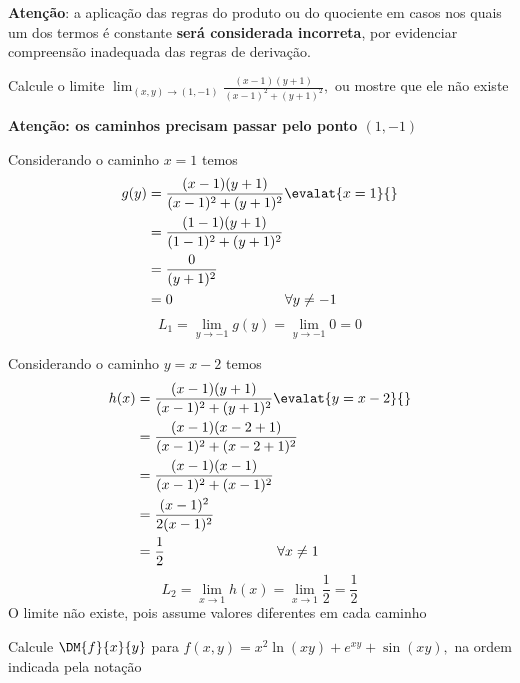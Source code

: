 \documentclass[a4paper,12pt,fleqn]{article}
\begin{document}

\bigskip
\textbf{Atenção}: a aplicação das regras do produto ou do quociente em casos
nos quais um dos termos é constante \textbf{será considerada incorreta},
por evidenciar compreensão inadequada das regras de derivação.

Calcule o limite
\(
    \lim_{(x,y) \to (1, -1)} \frac{(x-1)(y+1)}{(x-1)^2 + (y+1)^2},
\)
ou mostre que ele não existe

\begin{answer}
  \textbf{Atenção: os caminhos precisam passar pelo ponto $(1, -1)$}
  \bigskip

  Considerando o caminho $x=1$ temos
  \begin{align*}
    g(y)
    & = \frac{(x-1)(y+1)}{(x-1)^2 + (y+1)^2} \evalat{x=1}{} \\
    & = \frac{(1-1)(y+1)}{(1-1)^2 + (y+1)^2} \\
    & = \frac{0}{(y+1)^2} \\
    & = 0 \qquad\qquad\qquad\qquad \forall y \neq -1
  \end{align*}
  \[
    L_1
    = \lim_{y\to -1} g(y)
    = \lim_{y\to -1} 0
    = 0
  \]

  Considerando o caminho $y=x-2$ temos
  \begin{align*}
    h(x)
    & = \frac{(x-1)(y+1)}{(x-1)^2 + (y+1)^2} \evalat{y=x-2}{} \\
    & = \frac{(x-1)(x-2+1)}{(x-1)^2 + (x-2+1)^2}\\
    & = \frac{(x-1)(x-1)}{(x-1)^2 + (x-1)^2}\\
    & = \frac{(x-1)^2}{2(x-1)^2}\\
    & = \frac{1}{2} \qquad\qquad\qquad\qquad \forall x\neq 1
  \end{align*}
  \[
    L_2
    = \lim_{x\to 1} h(x)
    = \lim_{x\to 1} \frac{1}{2}
    = \frac{1}{2}
  \]
  O limite não existe, pois assume valores diferentes em cada caminho
\end{answer}

Calcule $\DM{f}{x}{y}$ para
\(
  f(x, y) = x^2 \ln(xy) + e^{xy} + \sin(xy),
\)
na ordem indicada pela notação
\end{document}
